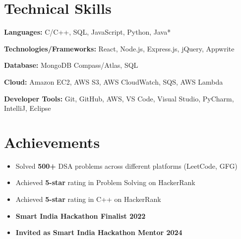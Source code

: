 \documentclass[letterpaper,10pt]{article}
\begin{document}
\section{Technical Skills}
\begin{itemize}[leftmargin=0.1in, label={}]
    \small{
        \item \textbf{Languages:} C/C++, SQL, JavaScript, Python, Java*
        \item \textbf{Technologies/Frameworks:} React, Node.js, Express.js, jQuery, Appwrite
        \item \textbf{Database:} MongoDB Compass/Atlas, SQL
        \item \textbf{Cloud:} Amazon EC2, AWS S3, AWS CloudWatch, SQS, AWS Lambda
        \item \textbf{Developer Tools:} Git, GitHub, AWS, VS Code, Visual Studio, PyCharm, IntelliJ, Eclipse
    }
\end{itemize}

\section{Achievements}
\begin{itemize}[leftmargin=0.2in]
 \item Solved \textbf{500+} DSA problems across different platforms (LeetCode, GFG)
 \item Achieved \textbf{5-star} rating in Problem Solving on HackerRank
 \item Achieved \textbf{5-star} rating in C++ on HackerRank
 \item \textbf{Smart India Hackathon Finalist 2022}
 \item \textbf{Invited as Smart India Hackathon Mentor 2024}
\end{itemize}



\end{document}
